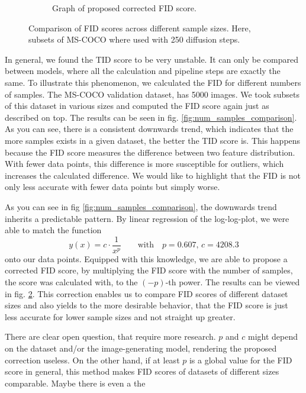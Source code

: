 \documentclass[11pt]{article}
\begin{document}
\begin{figure}
\begin{subfigure}{0.4\textwidth}
        \caption{Graph of proposed corrected FID score.}
        \label{fig:num_samples_comparison_corrected}
    \end{subfigure}
    \caption{Comparison of FID scores across different sample sizes. Here, subsets of MS-COCO where used with 250 diffusion steps.}
\end{figure}

In general, we found the TID score to be very unstable. It can only be compared between models, where all the calculation and pipeline steps are exactly the same. To illustrate this phenomenon, we calculated the FID for different numbers of samples. The MS-COCO validation dataset, has 5000 images. We took subsets of this dataset in various sizes and computed the FID score again just as described on top. The results can be seen in fig. \ref{fig:num_samples_comparison}. As you can see, there is a consistent downwards trend, which indicates that the more samples exists in a given dataset, the better the TID score is. This happens because the FID score measures the difference between two feature distribution. With fewer data points, this difference is more susceptible for outliers, which increases the calculated difference. We would like to highlight that the FID is not only less accurate with fewer data points but simply worse.

As you can see in fig \ref{fig:num_samples_comparison}, the downwards trend inherits a predictable pattern. By linear regression of the log-log-plot, we were able to match the function
$$ y(x) = c\cdot \frac{1}{x^p} \qquad\mathrm{with}\quad p = 0.607,\, c = 4208.3$$
onto our data points. Equipped with this knowledge, we are able to propose a corrected FID score, by multiplying the FID score with the number of samples, the score was calculated with, to the $(-p)$-th power. The results can be viewed in fig. \ref{fig:num_samples_comparison_corrected}. This correction enables us to compare FID scores of different dataset sizes and also yields to the more desirable behavior, that the FID score is just less accurate for lower sample sizes and not straight up greater.

There are clear open question, that require more research. $p$ and $c$ might depend on the dataset and/or the image-generating model, rendering the proposed correction useless. On the other hand, if at least $p$ is a global value for the FID score in general, this method makes FID scores of datasets of different sizes comparable. Maybe there is even a the
\end{document}
